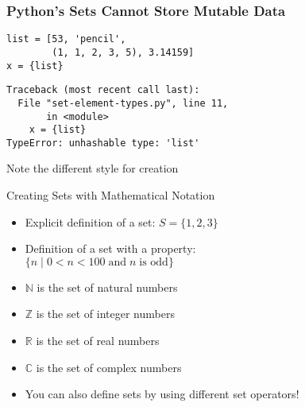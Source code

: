 \documentclass[14pt,aspectratio=169]{beamer}
\begin{document}
%
\begin{frame}[fragile]
  \frametitle{Python's Sets Cannot Store Mutable Data}
  \normalsize
  \begin{minipage}{6in}
    \vspace*{.25in}
    \begin{verbatim}
list = [53, 'pencil',
        (1, 1, 2, 3, 5), 3.14159]
x = {list}
    \end{verbatim}
    \vspace*{.15in}
    \begin{verbatim}
Traceback (most recent call last):
  File "set-element-types.py", line 11,
       in <module>
    x = {list}
TypeError: unhashable type: 'list'
    \end{verbatim}
  \end{minipage}
  \vspace*{.05in}
  \begin{center}
    \normalsize \noindent Note the different style for creation \\
  \end{center}
\end{frame}

%
\begin{frame}{Creating Sets with Mathematical Notation}
  \begin{itemize}
    \item Explicit definition of a set: $S = \{1, 2, 3\}$
      \vspace*{-.15in}
    \item Definition of a set with a property:\\ $\{ n \; | \; 0 < n < 100
      \;\mbox{and}\; n \;\mbox{is odd} \}$
      \vspace*{-.15in}
    \item $\mathbb{N}$ is the set of natural numbers
      \vspace*{-.15in}
    \item $\mathbb{Z}$ is the set of integer numbers
      \vspace*{-.15in}
    \item $\mathbb{R}$ is the set of real numbers
      \vspace*{-.15in}
    \item $\mathbb{C}$ is the set of complex numbers
      \vspace*{-.15in}
    \item You can also define sets by using different set operators!
  \end{itemize}
\end{frame}
\end{document}
